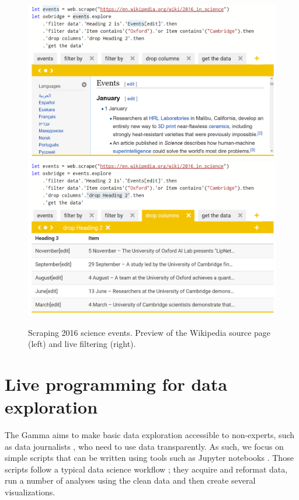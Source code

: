 \documentclass[sigplan,10pt,review,anonymous]{acmart}\settopmatter{printfolios=true,printccs=false,printacmref=false}
\theoremstyle{plain}
\theoremstyle{definition}
\begin{document}
\begin{figure}
\includegraphics[scale=0.21]{wiki.png}
\includegraphics[scale=0.21]{drop.png}
\caption{Scraping 2016 science events. Preview of the Wikipedia source page (left) and live filtering (right).}
\label{fig:thegamma}
\end{figure}


\section{Live programming for data exploration}
\label{sec:live}

The Gamma aims to make basic data exploration accessible to non-experts, such as data journalists \cite{ddj}, 
who need to use data transparently. As such, we focus on simple scripts that can be written using
tools such as Jupyter notebooks \cite{jupyter}. Those scripts follow a typical data science workflow \cite{workflow};
they acquire and reformat data, run a number of analyses using the clean data and then create 
several visualizations.
\end{document}

